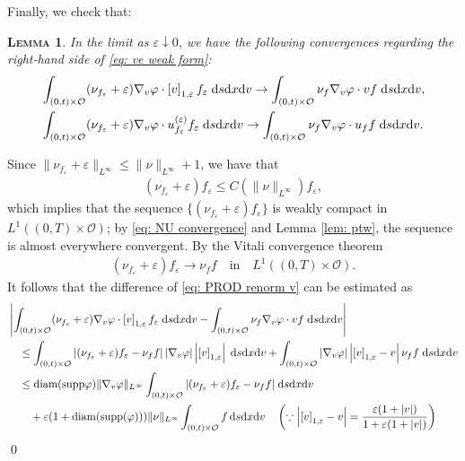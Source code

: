 \documentclass[10pt, reqno]{amsart}
\theoremstyle{plain}
\newtheorem{lemma}[theorem]{\normalfont \scshape Lemma}
\theoremstyle{definition}
\theoremstyle{remark}
\renewenvironment{proof}[1][\proofname]{\noindent{\scshape #1.\quad}}{\qed}
\numberwithin{equation}{section}
\newcommand{\calO}{\mathcal O}
\newcommand{\ve}{\varepsilon}
\newcommand{\dx}{\textnormal{d}x}
\newcommand{\dv}{\textnormal{d}v}
\newcommand{\ds}{\textnormal{d}s}
\newcommand{\lt}{\left}
\newcommand{\rt}{\right}
\newcommand{\renorm}[3]{\lt[#1\rt]_{#2 , #3}}
\begin{document}
Finally, we check that:
\begin{lemma}
In the limit as $\ve\downarrow 0$, we have the following convergences regarding the right-hand side of \eqref{eq: ve weak form}:
\begin{align}
    &\int_{(0,t)\times \calO} (\nu_{f_\ve} + \ve) \nabla_v \varphi \cdot \renorm{v}{1}{\ve}  f_\ve \;\ds\dx\dv \to \int_{(0,t)\times \calO} \nu_f \nabla_v\varphi \cdot v f \;\ds\dx\dv,  \label{eq: PROD renorm v} \\
    &\int_{(0,t)\times \calO} (\nu_{f_\ve} + \ve) \nabla_v\varphi \cdot u_{f_\ve}^{(\ve)} f_\ve \;\ds\dx\dv \to \int_{(0,t)\times \calO} \nu_f \nabla_v\varphi \cdot u_f f \;\ds\dx\dv. \label{eq: PROD u}
\end{align}
\end{lemma}
\begin{proof}
Since $\|\nu_{f_\ve} + \ve \|_{L^\infty} \le \|\nu\|_{L^\infty} + 1$, we have that
\begin{align*}
    (\nu_{f_\ve} + \ve) f_\ve \le C(\|\nu\|_{L^\infty}) f_\ve,
\end{align*}
which implies that the sequence $\{(\nu_{f_\ve} + \ve) f_\ve\}$ is weakly compact in $L^1((0,T)\times \calO)$; by \eqref{eq: NU convergence} and Lemma \ref{lem: ptw}, the sequence is almost everywhere convergent. By the Vitali convergence theorem
\begin{align*}
    (\nu_{f_\ve} + \ve) f_\ve \to \nu_f f \quad \text{in}\quad L^1((0,T)\times \calO).
\end{align*}
It follows that the difference of \eqref{eq: PROD renorm v} can be estimated as
\begin{align*}
    &\lt|\int_{(0,t)\times \calO} (\nu_{f_\ve} + \ve) \nabla_v \varphi \cdot \renorm{v}{1}{\ve}  f_\ve \;\ds\dx\dv - \int_{(0,t)\times \calO} \nu_f \nabla_v\varphi \cdot v f \;\ds\dx\dv \rt| \\
    &\quad\le \int_{(0,t)\times \calO} \lt| (\nu_{f_\ve} + \ve) f_\ve  - \nu_f f \rt|  |\nabla_v \varphi| \lt|\renorm{v}{1}{\ve} \rt| \;\ds\dx\dv  + \int_{(0,t)\times \calO} |\nabla_v \varphi| \lt|\renorm{v}{1}{\ve} - v \rt| \nu_f f \;\ds\dx\dv \\
    &\quad\le \textnormal{diam}(\textnormal{supp}\varphi) \|\nabla_v\varphi\|_{L^\infty} \int_{(0,t)\times \calO} |(\nu_{f_\ve} + \ve) f_\ve - \nu_f f| \;\ds\dx\dv \\
    &\qquad + \ve ( 1 + \textnormal{diam}(\textnormal{supp}(\varphi))) \|\nu\|_{L^\infty} \int_{(0,t)\times \calO} f \,\ds\dx\dv \quad \lt(\because \lt|\renorm{v}{1}{\ve} - v\rt| = \frac{\ve ( 1 + |v|)}{1 + \ve (1 + |v|)} \rt) \\

\end{align*}
\end{proof}
\end{document}
